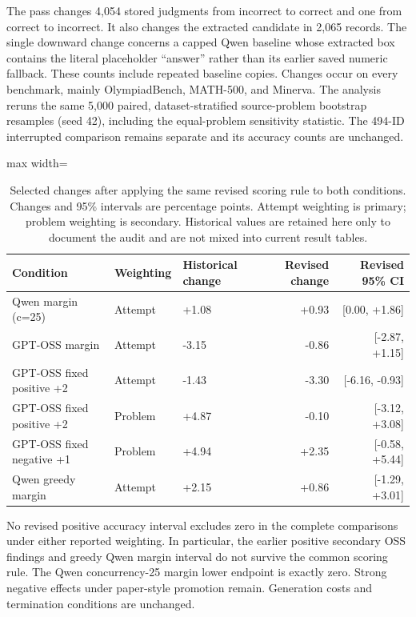 \documentclass[12pt,a4paper,twoside,openright]{book}
\begin{document}
The pass changes 4,054 stored judgments from incorrect to correct and one
from correct to incorrect. It also changes the extracted candidate in
2,065 records. The single downward change concerns a capped Qwen baseline
whose extracted box contains the literal placeholder ``answer'' rather
than its earlier saved numeric fallback. These counts include repeated
baseline copies. Changes occur on every benchmark, mainly OlympiadBench,
MATH-500, and Minerva. The analysis reruns the same 5,000 paired,
dataset-stratified source-problem bootstrap resamples (seed 42), including
the equal-problem sensitivity statistic. The 494-ID interrupted comparison
remains separate and its accuracy counts are unchanged.

\begin{table}[!ht]
\centering\small
\caption{Selected changes after applying the same revised scoring rule to both conditions. Changes and 95\% intervals are percentage points. Attempt weighting is primary; problem weighting is secondary. Historical values are retained here only to document the audit and are not mixed into current result tables.}
\label{tab:guiding-rescoring-audit}
\begin{adjustbox}{max width=\linewidth}%
\begin{tabular}{lllrr}
\toprule
Condition & Weighting & Historical change & Revised change & Revised 95\% CI \\
\midrule
Qwen margin (c=25) & Attempt & +1.08 & +0.93 & [0.00, +1.86] \\
GPT-OSS margin & Attempt & -3.15 & -0.86 & [-2.87, +1.15] \\
GPT-OSS fixed positive +2 & Attempt & -1.43 & -3.30 & [-6.16, -0.93] \\
GPT-OSS fixed positive +2 & Problem & +4.87 & -0.10 & [-3.12, +3.08] \\
GPT-OSS fixed negative +1 & Problem & +4.94 & +2.35 & [-0.58, +5.44] \\
Qwen greedy margin & Attempt & +2.15 & +0.86 & [-1.29, +3.01] \\
\bottomrule
\end{tabular}
\end{adjustbox}
\end{table}

No revised positive accuracy interval excludes zero in the complete
comparisons under either reported weighting. In particular, the earlier
positive secondary OSS findings and greedy Qwen margin interval do not
survive the common scoring rule. The Qwen concurrency-25 margin lower
endpoint is exactly zero. Strong negative effects under paper-style
promotion remain. Generation costs and termination conditions are unchanged.
\end{document}
